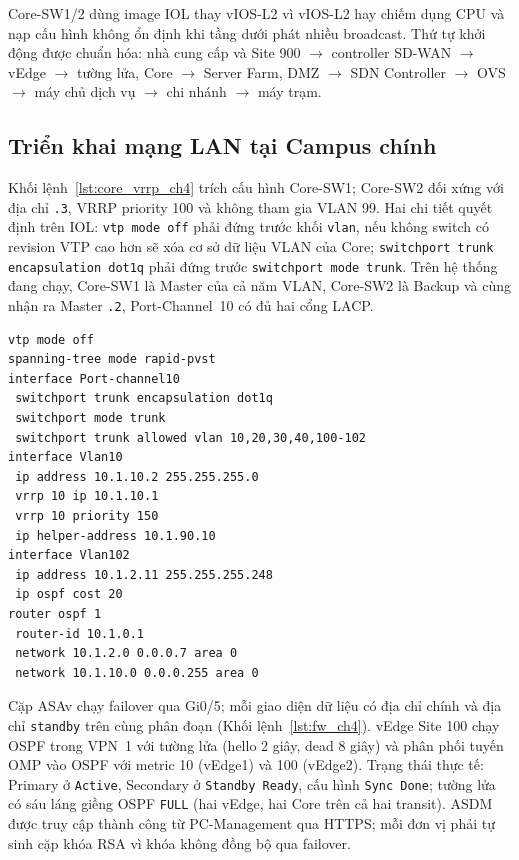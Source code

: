 Core-SW1/2 dùng image IOL thay vIOS-L2 vì vIOS-L2 hay chiếm dụng CPU và nạp cấu hình không ổn định khi tầng dưới phát nhiều broadcast. Thứ tự khởi động được chuẩn hóa: nhà cung cấp và Site 900 $\rightarrow$ controller SD-WAN $\rightarrow$ vEdge $\rightarrow$ tường lửa, Core $\rightarrow$ Server Farm, DMZ $\rightarrow$ SDN Controller $\rightarrow$ OVS $\rightarrow$ máy chủ dịch vụ $\rightarrow$ chi nhánh $\rightarrow$ máy trạm.

\subsection{Triển khai mạng LAN tại Campus chính}\label{sec:fw_ha}

Khối lệnh~\ref{lst:core_vrrp_ch4} trích cấu hình Core-SW1; Core-SW2 đối xứng với địa chỉ \texttt{.3}, VRRP priority 100 và không tham gia VLAN 99. Hai chi tiết quyết định trên IOL: \texttt{vtp mode off} phải đứng trước khối \texttt{vlan}, nếu không switch có revision VTP cao hơn sẽ xóa cơ sở dữ liệu VLAN của Core; \texttt{switchport trunk encapsulation dot1q} phải đứng trước \texttt{switchport mode trunk}. Trên hệ thống đang chạy, Core-SW1 là Master của cả năm VLAN, Core-SW2 là Backup và cùng nhận ra Master \texttt{.2}, Port-Channel~10 có đủ hai cổng LACP.

\begin{lstlisting}[style=customcode,caption={Trích cấu hình Core-SW1},label={lst:core_vrrp_ch4}]
vtp mode off
spanning-tree mode rapid-pvst
interface Port-channel10
 switchport trunk encapsulation dot1q
 switchport mode trunk
 switchport trunk allowed vlan 10,20,30,40,100-102
interface Vlan10
 ip address 10.1.10.2 255.255.255.0
 vrrp 10 ip 10.1.10.1
 vrrp 10 priority 150
 ip helper-address 10.1.90.10
interface Vlan102
 ip address 10.1.2.11 255.255.255.248
 ip ospf cost 20
router ospf 1
 router-id 10.1.0.1
 network 10.1.2.0 0.0.0.7 area 0
 network 10.1.10.0 0.0.0.255 area 0
\end{lstlisting}

Cặp ASAv chạy failover qua Gi0/5; mỗi giao diện dữ liệu có địa chỉ chính và địa chỉ \texttt{standby} trên cùng phân đoạn (Khối lệnh~\ref{lst:fw_ch4}). vEdge Site 100 chạy OSPF trong VPN~1 với tường lửa (hello 2 giây, dead 8 giây) và phân phối tuyến OMP vào OSPF với metric 10 (vEdge1) và 100 (vEdge2). Trạng thái thực tế: Primary ở \texttt{Active}, Secondary ở \texttt{Standby Ready}, cấu hình \texttt{Sync Done}; tường lửa có sáu láng giềng OSPF \texttt{FULL} (hai vEdge, hai Core trên cả hai transit). ASDM được truy cập thành công từ PC-Management qua HTTPS; mỗi đơn vị phải tự sinh cặp khóa RSA vì khóa không đồng bộ qua failover.

